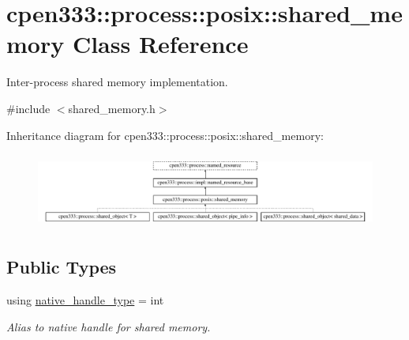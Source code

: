 \hypertarget{classcpen333_1_1process_1_1posix_1_1shared__memory}{}\section{cpen333\+:\+:process\+:\+:posix\+:\+:shared\+\_\+memory Class Reference}
\label{classcpen333_1_1process_1_1posix_1_1shared__memory}


Inter-\/process shared memory implementation.  




{\ttfamily \#include $<$shared\+\_\+memory.\+h$>$}

Inheritance diagram for cpen333\+:\+:process\+:\+:posix\+:\+:shared\+\_\+memory\+:\begin{figure}[H]
\begin{center}
\leavevmode
\includegraphics[height=2.488889cm]{classcpen333_1_1process_1_1posix_1_1shared__memory}
\end{center}
\end{figure}
\subsection*{Public Types}
\begin{DoxyCompactItemize}
\item 
\mbox{\label{classcpen333_1_1process_1_1posix_1_1shared__memory_a4bec0d0093c8bcfa3283a5da8ef1fc78}} 
using \hyperlink{classcpen333_1_1process_1_1posix_1_1shared__memory_a4bec0d0093c8bcfa3283a5da8ef1fc78}{native\+\_\+handle\+\_\+type} = int
\begin{DoxyCompactList}\small\item\em Alias to native handle for shared memory. \end{DoxyCompactList}\end{DoxyCompactItemize}
